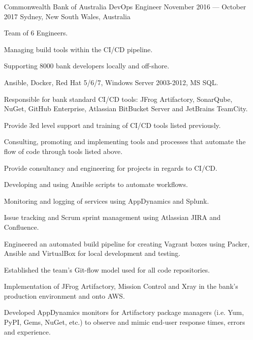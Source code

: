 \begin{experiences}
  \expitem
  {Commonwealth Bank of Australia} %
  {DevOps Engineer} %
  {November 2016 --- October 2017} %
  {Sydney, New South Wales, Australia} %
  {
    \begin{cvitems}
      \item {Team of 6 Engineers.}
      \item {Managing build tools within the CI/CD pipeline.}
      \item {Supporting 8000 bank developers locally and off-shore.}
      \item {Ansible, Docker, Red Hat 5/6/7, Windows Server 2003-2012, MS SQL.}
    \end{cvitems}
  }
  {
    \begin{cvitems}
      \item {Responsible for bank standard CI/CD tools: JFrog Artifactory, SonarQube, NuGet, GitHub Enterprise, Atlassian BitBucket Server and JetBrains TeamCity.}
      \item {Provide 3rd level support and training of CI/CD tools listed previously.}
      \item {Consulting, promoting and implementing tools and processes that automate the flow of code through tools listed above.}
      \item {Provide consultancy and engineering for projects in regards to CI/CD.}
      \item {Developing and using Ansible scripts to automate workflows.}
      \item {Monitoring and logging of services using AppDynamics and Splunk.}
      \item {Issue tracking and Scrum sprint management using Atlassian JIRA and Confluence.}
    \end{cvitems}
  }
  {
    \begin{cvitems}
      \item {Engineered an automated build pipeline for creating Vagrant boxes using Packer, Ansible and VirtualBox for local development and testing.}
      \item {Established the team's Git-flow model used for all code repositories.}
      \item {Implementation of JFrog Artifactory, Mission Control and Xray in the bank's production environment and onto AWS.}
      \item {Developed AppDynamics monitors for Artifactory package managers (i.e. Yum, PyPI, Gems, NuGet, etc.) to observe and mimic end-user response times, errors and experience.}    \end{cvitems}
  }


\end{experiences}
